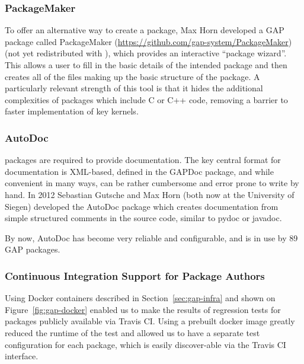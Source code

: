 \subsubsection{PackageMaker}
To offer an alternative way to create a package,
Max Horn developed a GAP package called {\sf PackageMaker}
(\url{https://github.com/gap-system/PackageMaker}) (not yet redistributed with \GAP),
which provides an interactive  ``package wizard''. This allows a
user to fill in the basic details 
of the intended package and then creates all of the files making up
the basic structure of the package. A particularly relevant
strength of this tool is that it hides the additional complexities of
packages which include C or C++ code, removing a barrier to faster implementation
of key kernels.

\subsubsection{AutoDoc}
\GAP packages are required to provide documentation.  The key central
format for \GAP documentation is XML-based, defined in the {\sf
  GAPDoc} package, and while convenient in many ways, can be rather
cumbersome and error prone to write by hand.
In 2012 Sebastian Gutsche 
and Max Horn (both now at the University of Siegen) developed the 
{\sf AutoDoc} package \cite{autodoc} which creates
documentation from simple structured comments in the source code,
similar to pydoc or javadoc.

By now, {\sf AutoDoc} has become very reliable and configurable, and
is in use by 89 GAP packages.
%
%

\subsubsection{Continuous Integration Support for Package Authors}
Using Docker containers described in Section~\ref{sec:gap-infra}
and shown on Figure~\ref{fig:gap-docker} enabled us to make the
results of regression tests for \GAP packages publicly
available via Travis CI. Using a prebuilt docker image 
greatly reduced the runtime of the test and allowed us to
have a separate test configuration for each package,
which is easily discover-able via the Travis CI interface.

